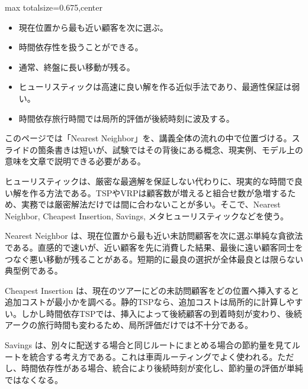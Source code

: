 \clearpage
{}
\begin{adjustbox}{max totalsize={\textwidth}{0.675\textheight},center}
\begin{minipage}{\textwidth}\scriptsize
\begin{minipage}[t]{0.485\textwidth}
\begin{itemize}
\item 現在位置から最も近い顧客を次に選ぶ。
\item 時間依存性を扱うことができる。
\item 通常、終盤に長い移動が残る。
\end{itemize}
\begin{itemize}
\item ヒューリスティックは高速に良い解を作る近似手法であり、最適性保証は弱い。
\item 時間依存旅行時間では局所的評価が後続時刻に波及する。
\end{itemize}
\end{minipage}\hfill
\begin{minipage}[t]{0.485\textwidth}
このページでは「Nearest Neighbor」を、講義全体の流れの中で位置づける。スライドの箇条書きは短いが、試験ではその背後にある概念、現実例、モデル上の意味を文章で説明できる必要がある。\par
ヒューリスティックは、厳密な最適解を保証しない代わりに、現実的な時間で良い解を作る方法である。TSPやVRPは顧客数が増えると組合せ数が急増するため、実務では厳密解法だけでは間に合わないことが多い。そこで、Nearest Neighbor, Cheapest Insertion, Savings, メタヒューリスティックなどを使う。\par
Nearest Neighbor は、現在位置から最も近い未訪問顧客を次に選ぶ単純な貪欲法である。直感的で速いが、近い顧客を先に消費した結果、最後に遠い顧客同士をつなぐ悪い移動が残ることがある。短期的に最良の選択が全体最良とは限らない典型例である。\par
Cheapest Insertion は、現在のツアーにどの未訪問顧客をどの位置へ挿入すると追加コストが最小かを調べる。静的TSPなら、追加コストは局所的に計算しやすい。しかし時間依存TSPでは、挿入によって後続顧客の到着時刻が変わり、後続アークの旅行時間も変わるため、局所評価だけでは不十分である。\par
Savings は、別々に配送する場合と同じルートにまとめる場合の節約量を見てルートを統合する考え方である。これは車両ルーティングでよく使われる。ただし、時間依存性がある場合、統合により後続時刻が変化し、節約量の評価が単純ではなくなる。\par

\end{minipage}
\end{minipage}
\end{adjustbox}
